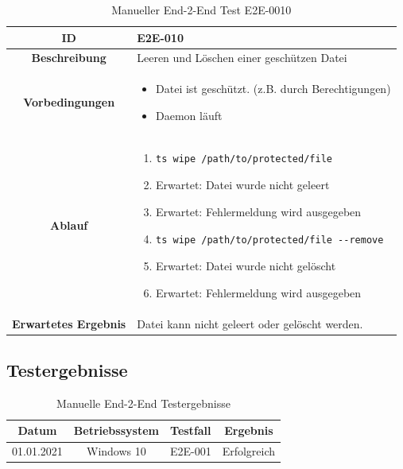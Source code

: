 \documentclass[a4paper,12pt]{report}
\begin{document}
    \begin{table}[h!]
        \centering
        \setlength{\leftmargini}{0.8cm}
        \begin{tabular}{|c|p{10cm}|}
            \hline
            \textbf{ID}           & E2E-010              \\ \hline
            \textbf{Beschreibung} & Leeren und Löschen einer geschützen Datei \\ \hline
            \textbf{Vorbedingungen} &
            \begin{itemize}
                \item Datei ist geschützt. (z.B. durch Berechtigungen)
                \item Daemon läuft
            \end{itemize} \\ \hline
            \textbf{Ablauf} &
            \begin{enumerate}
                \item \begin{verbatim}ts wipe /path/to/protected/file\end{verbatim}
                \item Erwartet: Datei wurde nicht geleert
                \item Erwartet: Fehlermeldung wird ausgegeben
                \item \begin{verbatim}ts wipe /path/to/protected/file --remove\end{verbatim}
                \item Erwartet: Datei wurde nicht gelöscht
                \item Erwartet: Fehlermeldung wird ausgegeben
            \end{enumerate} \\ \hline
            \textbf{Erwartetes Ergebnis} & Datei kann nicht geleert oder gelöscht werden. \\ \hline
        \end{tabular}
        \caption{Manueller End-2-End Test E2E-0010}\label{tab:e2e-10}
    \end{table}


    \subsection{Testergebnisse}
    \begin{table}[h!]
        \centering
        \setlength{\leftmargini}{0.4cm}
        \begin{tabular}{|c|c|c|c|}
            \hline
            \textbf{Datum} & \textbf{Betriebssystem} & \textbf{Testfall} & \textbf{Ergebnis} \\ \hline
            01.01.2021     & Windows 10              & E2E-001          & Erfolgreich       \\ \hline
        \end{tabular}
        \caption{Manuelle End-2-End Testergebnisse}\label{tab:e2e-results}
    \end{table}
\end{document}
